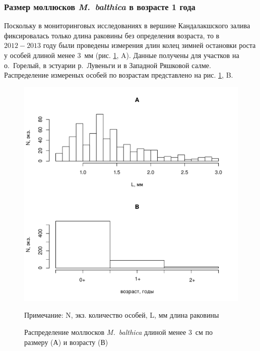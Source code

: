 
	\subsubsection{Размер моллюсков {\it M.~balthica} в возрасте 1 года}

Поскольку в мониторинговых исследованиях в вершине Кандалакшского залива фиксировалась только длина раковины без определения возраста, то в $2012 - 2013$ году были проведены  измерения длин колец зимней остановки роста у особей длиной менее $3$~мм (рис. \ref{ris:vozrast_menee_3mm}, A). 
Данные получены для участков на о.~Горелый, в эстуарии р.~Лувеньги и в Западной Ряшковой салме. 
Распределение измереных особей по возрастам представлено на рис. \ref{ris:vozrast_menee_3mm}, B.
	\begin{figure}[p]
		\includegraphics{../White_Sea/growth_young/hist_obili_po_godam1.pdf}
	\caption{Распределение моллюсков {\it M.~balthica} длиной менее $3$~см по размеру (А) и возрасту (В)}
	\label{ris:vozrast_menee_3mm}
	{\footnotesize Примечание: N, экз. \textemdash количество особей, L, мм \textemdash длина раковины}
	\end{figure}


